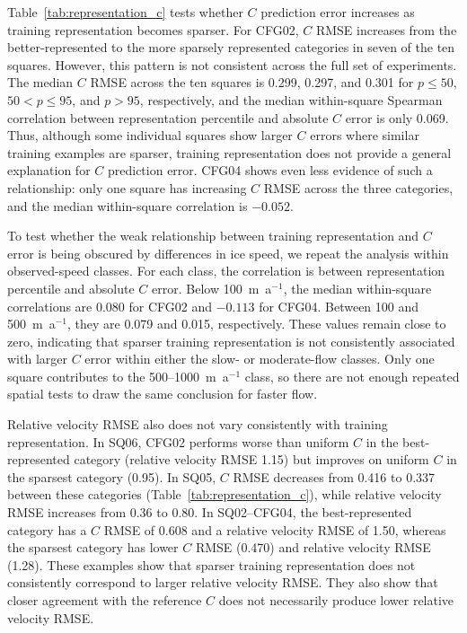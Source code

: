\documentclass[review,jog]{igs}
\begin{document}
Table~\ref{tab:representation_c} tests whether $C$ prediction error increases
as training representation becomes sparser. For CFG02, $C$ RMSE increases
from the better-represented to the more sparsely represented categories in
seven of the ten squares. However, this pattern is not consistent across the
full set of experiments. The median $C$ RMSE across the ten squares is 0.299,
0.297, and 0.301 for $p\leq50$, $50<p\leq95$, and $p>95$, respectively, and
the median within-square Spearman correlation between representation
percentile and absolute $C$ error is only 0.069. Thus, although some individual
squares show larger $C$ errors where similar training examples are sparser,
training representation does not provide a general explanation for $C$
prediction error. CFG04 shows even less evidence of such a relationship:
only one square has increasing $C$ RMSE across the three categories, and the
median within-square correlation is $-0.052$.

To test whether the weak relationship between training representation and
$C$ error is being obscured by differences in ice speed, we repeat the
analysis within observed-speed classes. For each class, the correlation is
between representation percentile and absolute $C$ error. Below
100~m~a$^{-1}$, the median within-square correlations are 0.080 for CFG02
and $-0.113$ for CFG04. Between 100 and 500~m~a$^{-1}$, they are 0.079 and
0.015, respectively. These values remain close to zero, indicating that
sparser training representation is not consistently associated with larger
$C$ error within either the slow- or moderate-flow classes. Only one square
contributes to the 500--1000~m~a$^{-1}$ class, so there are not enough
repeated spatial tests to draw the same conclusion for faster flow.

Relative velocity RMSE also does not vary consistently with training representation. In SQ06, CFG02 performs worse than uniform $C$ in the best-represented category (relative velocity RMSE 1.15) but improves on uniform $C$ in the sparsest category (0.95). In SQ05, $C$ RMSE decreases from 0.416 to 0.337 between these categories (Table~\ref{tab:representation_c}), while relative velocity RMSE increases from 0.36 to 0.80. In SQ02--CFG04, the best-represented category has a $C$ RMSE of 0.608 and a relative velocity RMSE of 1.50, whereas the sparsest category has lower $C$ RMSE (0.470) and relative velocity RMSE (1.28). These examples show that sparser training representation does not consistently correspond to larger relative velocity RMSE. They also show that closer agreement with the reference $C$ does not necessarily produce lower relative velocity RMSE.
\end{document}
